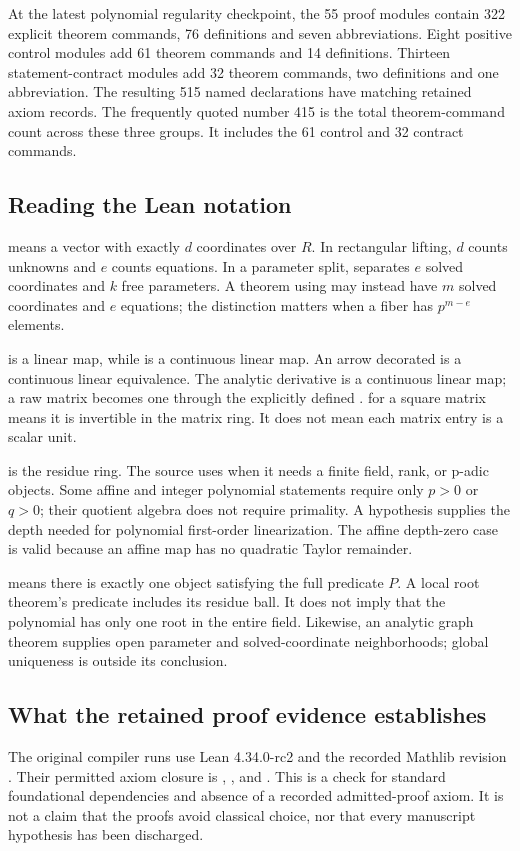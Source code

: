 At the latest polynomial regularity checkpoint, the 55 proof modules contain 322 explicit theorem commands, 76 definitions and seven abbreviations. Eight positive control modules add 61 theorem commands and 14 definitions. Thirteen statement-contract modules add 32 theorem commands, two definitions and one abbreviation. The resulting 515 named declarations have matching retained axiom records. The frequently quoted number 415 is the total theorem-command count across these three groups. It includes the 61 control and 32 contract commands.

\subsection{Reading the Lean notation}
 means a vector with exactly $d$ coordinates over $R$. In rectangular lifting, $d$ counts unknowns and $e$ counts equations. In a parameter split,  separates $e$ solved coordinates and $k$ free parameters. A theorem using  may instead have $m$ solved coordinates and $e$ equations; the distinction matters when a fiber has $p^{m-e}$ elements.

 is a linear map, while  is a continuous linear map. An arrow decorated  is a continuous linear equivalence. The analytic derivative is a continuous linear map; a raw matrix becomes one through the explicitly defined .  for a square matrix means it is invertible in the matrix ring. It does not mean each matrix entry is a scalar unit.

 is the residue ring. The source uses  when it needs a finite field, rank, or p-adic objects. Some affine and integer polynomial statements require only $p>0$ or $q>0$; their quotient algebra does not require primality. A hypothesis  supplies the depth needed for polynomial first-order linearization. The affine depth-zero case is valid because an affine map has no quadratic Taylor remainder.

 means there is exactly one object satisfying the full predicate $P$. A local root theorem's predicate includes its residue ball. It does not imply that the polynomial has only one root in the entire field. Likewise, an analytic graph theorem supplies open parameter and solved-coordinate neighborhoods; global uniqueness is outside its conclusion.

\subsection{What the retained proof evidence establishes}
The original compiler runs use Lean 4.34.0-rc2 and the recorded Mathlib revision . Their permitted axiom closure is , , and . This is a check for standard foundational dependencies and absence of a recorded admitted-proof axiom. It is not a claim that the proofs avoid classical choice, nor that every manuscript hypothesis has been discharged.

